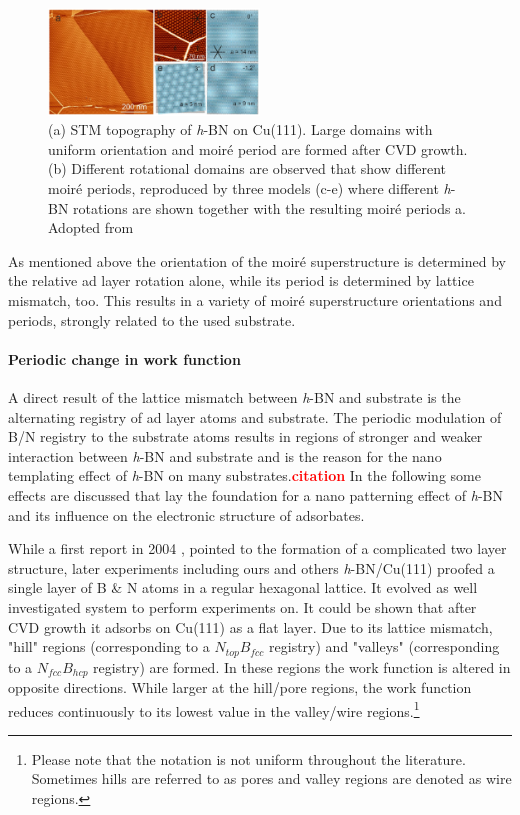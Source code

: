 \begin{figure} \centering
	\includegraphics[width=0.5\textwidth]{./images/h-BN-cvd-cu111.png}%
\caption{(a) STM topography of \textit{h}-BN on Cu(111). Large domains with uniform orientation and moir\'e period are formed after CVD growth. (b) Different rotational domains are observed that show different moir\'e periods, reproduced by three models (c-e) where different \textit{h}-BN rotations are shown together with the resulting moir\'e periods a. Adopted from \cite{joshi_boron_2012}}
\label{fig:moire-STM-model}
\end{figure}

As mentioned above the orientation of the moir\'e superstructure is determined by the relative ad layer rotation alone, while its period is determined by lattice mismatch, too. This results in a variety of moir\'e superstructure orientations and periods, strongly related to the used substrate.
	
\paragraph{Periodic change in work function}
A direct result of the lattice mismatch between \textit{h}-BN and substrate is the alternating registry of ad layer atoms and substrate. The periodic modulation of B/N registry to the substrate atoms results in regions of stronger and weaker interaction between \textit{h}-BN and substrate and is the reason for the nano templating effect of \textit{h}-BN on many substrates.\textcolor{red}{\textbf{citation}} In the following some effects are discussed that lay the foundation for a nano patterning effect of \textit{h}-BN and its influence on the electronic structure of adsorbates.

While a first report in 2004 \cite{corso_boron_2004}, pointed to the formation of a complicated two layer structure, later experiments \cite{roth_chemical_2013, li_grain_2015} including ours \cite{joshi_boron_2012, schwarz_corrugation_2017} and others \textit{h}-BN/Cu(111) proofed a single layer of B \& N atoms in a regular hexagonal lattice. It evolved as well investigated system to perform experiments on. It could be shown that after CVD growth it adsorbs on Cu(111) as a flat layer. Due to its  lattice mismatch, "hill" regions  (corresponding to a $N_{top}B_{fcc}$ registry) and "valleys" (corresponding to a $N_{fcc}B_{hcp}$ registry) are formed. In these regions the work function is altered in opposite directions. While larger at the hill/pore regions, the work function reduces continuously to its lowest value in the valley/wire regions.\footnote{Please note that the notation is not uniform throughout the literature. Sometimes hills are referred to as pores and valley regions are denoted as wire regions.} 

